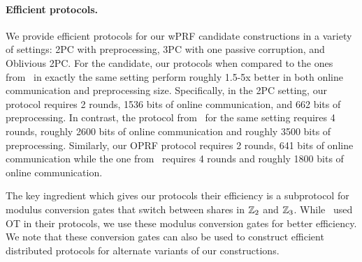 \paragraph{Efficient protocols.} 
We provide efficient protocols for our wPRF candidate constructions in a variety of settings: 2PC with preprocessing, 3PC with one passive corruption, and Oblivious 2PC. For the \ttwPRF candidate, our protocols when compared to the ones from~\cite{boneh2018-darkmatter} in exactly the same setting perform roughly 1.5-5x better in both online communication and preprocessing size. Specifically, in the 2PC setting, our protocol requires 2 rounds, 1536 bits of online communication, and 662 bits of preprocessing. In contrast, the protocol from~\cite{boneh2018-darkmatter} for the same setting requires 4 rounds, roughly 2600 bits of online communication and roughly 3500 bits of preprocessing. Similarly, our OPRF protocol requires 2 rounds, 641 bits of online communication while the one from~\cite{boneh2018-darkmatter} requires 4 rounds and roughly 1800 bits of online communication.

The key ingredient which gives our protocols their efficiency is a subprotocol for modulus conversion gates that switch between shares in $\mathbb{Z}_2$ and $\mathbb{Z}_3$. While~\cite{boneh2018-darkmatter} used OT in their protocols, we use these modulus conversion gates for better efficiency. We note that these conversion gates can also be used to construct efficient distributed protocols for alternate variants of our constructions.


